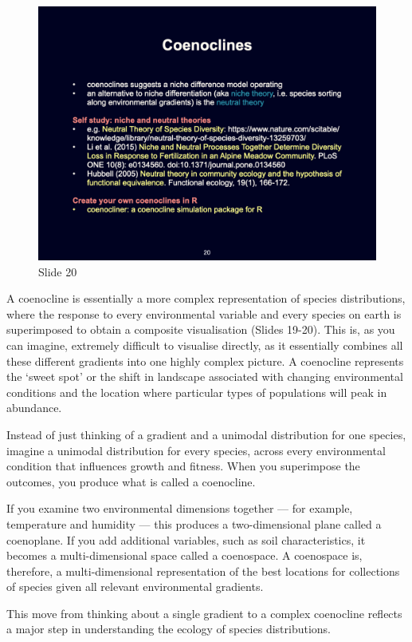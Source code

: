 \documentclass[
  11pt,
]{book}
\begin{document}
\begin{figure}[ht]
\centering
\includegraphics[width=0.8\linewidth]{../images/BDC334/BDC334-020.jpeg}
\caption*{Slide 20}
\end{figure}

A coenocline is essentially a more complex representation of species
distributions, where the response to every environmental variable and
every species on earth is superimposed to obtain a composite
visualisation (Slides 19-20). This is, as you can imagine, extremely
difficult to visualise directly, as it essentially combines all these
different gradients into one highly complex picture. A coenocline
represents the `sweet spot' or the shift in landscape associated with
changing environmental conditions and the location where particular
types of populations will peak in abundance.

Instead of just thinking of a gradient and a unimodal distribution for
one species, imagine a unimodal distribution for every species, across
every environmental condition that influences growth and fitness. When
you superimpose the outcomes, you produce what is called a coenocline.

If you examine two environmental dimensions together --- for example,
temperature and humidity --- this produces a two-dimensional plane
called a coenoplane. If you add additional variables, such as soil
characteristics, it becomes a multi-dimensional space called a
coenospace. A coenospace is, therefore, a multi-dimensional
representation of the best locations for collections of species given
all relevant environmental gradients.

This move from thinking about a single gradient to a complex coenocline
reflects a major step in understanding the ecology of species
distributions.
\end{document}

